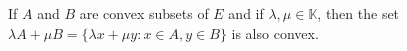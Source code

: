 If $A$ and $B$ are convex subsets of $E$ and if $\lambda, \mu \in \mathbb{K}$, then the set $\lambda A + \mu B = \{\lambda x + \mu y : x \in A, y \in B\}$ is also convex.